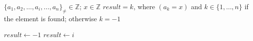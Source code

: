   \REQUIRE $\{a_1, a_2,\ldots, a_i, \ldots, a_n\}_{\ne} \in \mathbb{Z}$; $x \in \mathbb{Z}$
  \ENSURE $result = k $, where $ (a_k = x) $ and $ k \in \{1,\ldots,n\} $ if the element is found; otherwise $k = -1$ 

  \STATE $result \leftarrow -1$
      \STATE $result \leftarrow i$
      \ENDIF
  \ENDFOR
